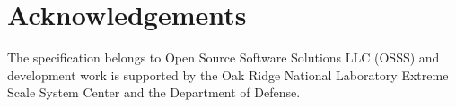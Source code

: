 \section*{Acknowledgements}

The \openshmem specification belongs to Open Source Software Solutions LLC (OSSS) and  
development work is supported by the Oak Ridge National
Laboratory Extreme Scale System Center and the Department of Defense.

%
%

{\large \pagebreak{}}
